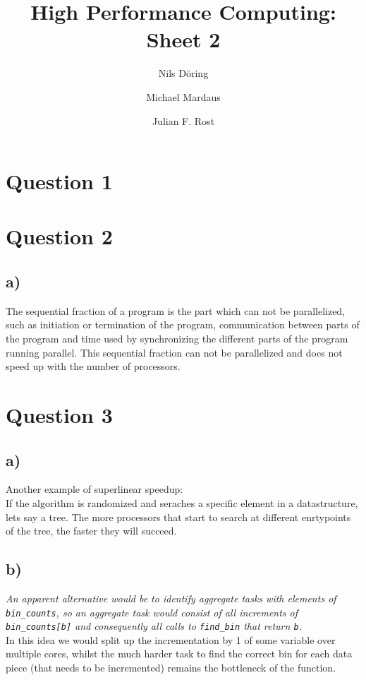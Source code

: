 \documentclass[10pt,a4paper]{scrartcl}
\author{Nils Döring \and Michael Mardaus \and Julian F. Rost}
\title{High Performance Computing: Sheet 2}
\begin{document}
\maketitle


\section{Question 1}


\section{Question 2}
\subsection{a)}
The sequential fraction of a program is the part which can not be parallelized, such as initiation or termination of the program, communication between parts of the program and time used by synchronizing the different parts of the program running parallel. This sequential fraction can not be parallelized and does not speed up with the number of processors.

\section{Question 3}

\subsection{a)}
Another example of superlinear speedup:\\
If the algorithm is randomized and seraches a specific element in a datastructure, lets say a tree. The more processors that start to search at different enrtypoints of the tree, the faster they will succeed.

\subsection{b)}
\textit{An apparent alternative would be to identify aggregate tasks with elements of \texttt{bin\_counts}, so an aggregate task would consist of all
increments of \texttt{bin\_counts[b]} and consequently all calls to \texttt{find\_bin} that return \texttt{b}.}\\

In this idea we would split up the incrementation by 1 of some variable over multiple cores, whilst the much harder task to find the correct bin for each data piece (that needs to be incremented) remains the bottleneck of the function.
\end{document}
